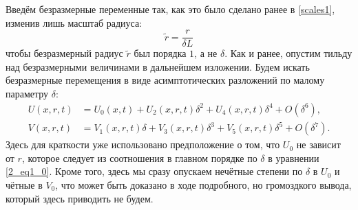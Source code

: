 \documentclass[12pt, a4paper]{report}
\begin{document}
Введём безразмерные переменные так, как это было сделано ранее в \eqref{scales1}, изменив лишь масштаб радиуса: %
\begin{equation}\label{2_scales_modif}
\tilde r = \frac{r}{\delta L}
\end{equation}
чтобы безразмерный радиус $\tilde r$ был порядка $1$, а не $\delta$. Как и ранее, опустим тильду над безразмерными величинами в дальнейшем изложении. Будем искать безразмерные перемещения в виде асимптотических разложений по малому параметру $\delta$:
\begin{align}
\label{expand_delta1}
U(x, r, t) &= U_0(x, t) + U_2(x, r, t) \delta^2 + U_4(x, r, t) \delta^4 + O(\delta^6),\\
\label{expand_delta2}
V(x, r, t) &= V_1(x, r, t)\delta + V_3(x, r, t) \delta^3 + V_5(x, r, t) \delta^5 + O(\delta^7).
\end{align}
%
%
Здесь для краткости уже использовано предположение о том, что $U_0$ не зависит от $r$, которое следует из соотношения в главном порядке по $\delta$ в уравнении \eqref{2_eq1_0}. Кроме того, здесь мы сразу опускаем нечётные степени по $\delta$ в $U_0$ и чётные в $V_0$, что может быть доказано в ходе подробного, но громоздкого вывода, который здесь приводить не будем.
\end{document}
